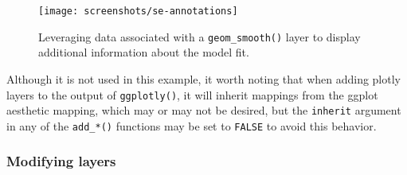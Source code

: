 \documentclass[12pt,]{isuthesis}
\newenvironment{Shaded}{\begin{snugshade}}{\end{snugshade}}
\newcommand{\KeywordTok}[1]{\textcolor[rgb]{0.13,0.29,0.53}{\textbf{{#1}}}}
\newcommand{\DataTypeTok}[1]{\textcolor[rgb]{0.13,0.29,0.53}{{#1}}}
\newcommand{\DecValTok}[1]{\textcolor[rgb]{0.00,0.00,0.81}{{#1}}}
\newcommand{\StringTok}[1]{\textcolor[rgb]{0.31,0.60,0.02}{{#1}}}
\newcommand{\NormalTok}[1]{{#1}}
\begin{document}
\begin{Shaded}
\end{Shaded}

\begin{figure}
\centering
\texttt{[image: screenshots/se-annotations]}
\caption{\label{fig:se-annotations}Leveraging data associated with a
\texttt{geom\_smooth()} layer to display additional information about
the model fit.}
\end{figure}

Although it is not used in this example, it worth noting that when
adding plotly layers to the output of \texttt{ggplotly()}, it will
inherit mappings from the ggplot aesthetic mapping, which may or may not
be desired, but the \texttt{inherit} argument in any of the
\texttt{add\_*()} functions may be set to \texttt{FALSE} to avoid this
behavior.

\hypertarget{modifying-layers}{\subsubsection{Modifying
layers}\label{modifying-layers}}
\end{document}

